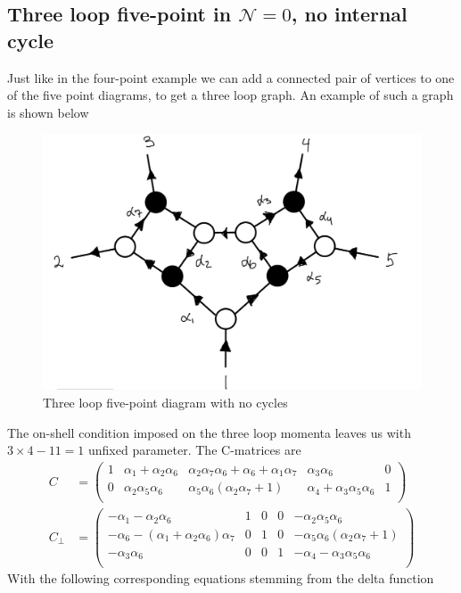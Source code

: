 \documentclass[letter,11pt]{article}
\begin{document}
\subsection{Three loop five-point in $\mathcal{N}=0$, no internal cycle}
Just like in the four-point example we can add a connected pair of vertices to one of the five point diagrams, to get a three loop graph. An example of such a graph is shown below
\begin{figure}[H]
	\centering
	\includegraphics[width=0.5\linewidth]{5pt3l}
	\caption{Three loop five-point diagram with no cycles}
	\label{fig:5pt3l_1}
\end{figure}
The on-shell condition imposed on the three loop momenta leaves us with $3\times 4-11=1$ unfixed parameter. The C-matrices are
\begin{equation}
	\begin{aligned}
		C&=\left(
		\begin{array}{ccccc}
			1 & \alpha _1+\alpha _2 \alpha _6 & \alpha _2 \alpha _7 \alpha _6+\alpha _6+\alpha _1 \alpha _7 & \alpha _3 \alpha _6 & 0 \\
			0 & \alpha _2 \alpha _5 \alpha _6 & \alpha _5 \alpha _6 \left(\alpha _2 \alpha _7+1\right) & \alpha _4+\alpha _3 \alpha _5 \alpha _6 & 1 \\
		\end{array}
		\right)\\
		C_\perp&=\left(
		\begin{array}{ccccc}
			-\alpha _1-\alpha _2 \alpha _6 & 1 & 0 & 0 & -\alpha _2 \alpha _5 \alpha _6 \\
			-\alpha _6-\left(\alpha _1+\alpha _2 \alpha _6\right) \alpha _7 & 0 & 1 & 0 & -\alpha _5 \alpha _6 \left(\alpha _2 \alpha _7+1\right) \\
			-\alpha _3 \alpha _6 & 0 & 0 & 1 & -\alpha _4-\alpha _3 \alpha _5 \alpha _6 \\
		\end{array}
		\right)
	\end{aligned}
\end{equation}
With the following corresponding equations stemming from the delta function
\end{document}
